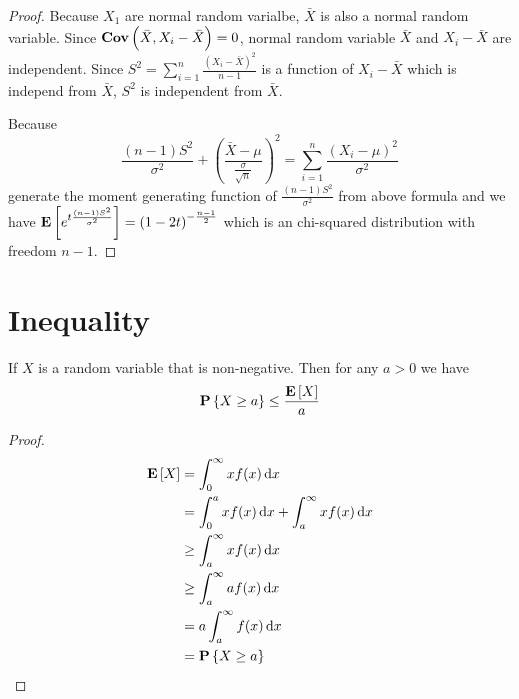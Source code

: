 \begin{proof}
    Because $X_1$ are normal random varialbe, $\bar{X}$ is also a normal random variable. Since $\mathop{\bf Cov\/}\displaystyle \left(\bar{X},X_i - \bar{X} \right) = 0$, normal random variable $\bar{X}$ and $X_i - \bar{X}$ are independent. Since $S^2 = \displaystyle \sum_{i=1}^n \frac{(X_i - \bar{X})^2}{n -1}$ is a function of $X_i - \bar{X}$ which is independ from $\bar{X}$, $S^2$ is independent from $\bar{X}$.
    
    Because 
    \begin{equation*}
        \frac{(n-1)S^2}{\sigma^2} + \left(\frac{\bar{X} - \mu}{\frac{\sigma}{\sqrt{n}}}\right)^2 = \sum_{i=1}^n \frac{(X_i - \mu)^2}{\sigma^2}
    \end{equation*}
    generate the moment generating function of $\displaystyle \frac{(n-1)S^2}{\sigma^2}$ from above formula and we have $\mathop{\bf E\/}\displaystyle \left[ e^{t \frac{(n-1)S^2}{\sigma^2}} \right] = \left(1-2t \right)^{- \frac{n-1}{2}}$ which is an chi-squared distribution with freedom $n-1$.
\end{proof}



\section{Inequality}

\begin{theorem}
If $X$ is a random variable that is non-negative. Then for any $a > 0$ we have 
\begin{equation}
    \mathop{\bf P\/}\displaystyle \left\{X \geq a\right\} \leq \frac{\mathop{\bf E\/}\displaystyle \left[ X \right]}{a}
\end{equation}    
\end{theorem}
\begin{proof}
    \begin{equation*}
        \begin{aligned}
            \expect{X} &= \int_0^\infty x f(x) \dif{x} \\
            &= \int_0^a x f(x) \dif{x} + \int_a^\infty x f(x) \dif{x} \\
            & \geq \int_a^\infty x f(x) \dif{x} \\
            & \geq \int_a^\infty a f(x) \dif{x} \\
            &= a \int_a^\infty f(x) \dif{x} \\
            &= \probability{X \geq a}
        \end{aligned}
    \end{equation*}
\end{proof}

